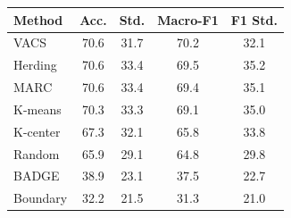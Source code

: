 \begin{tabular}{lcccc}
\toprule
Method & Acc. & Std. & Macro-F1 & F1 Std. \\
\midrule
VACS & 70.6 & 31.7 & 70.2 & 32.1 \\
Herding & 70.6 & 33.4 & 69.5 & 35.2 \\
MARC & 70.6 & 33.4 & 69.4 & 35.1 \\
K-means & 70.3 & 33.3 & 69.1 & 35.0 \\
K-center & 67.3 & 32.1 & 65.8 & 33.8 \\
Random & 65.9 & 29.1 & 64.8 & 29.8 \\
BADGE & 38.9 & 23.1 & 37.5 & 22.7 \\
Boundary & 32.2 & 21.5 & 31.3 & 21.0 \\
\bottomrule
\end{tabular}
